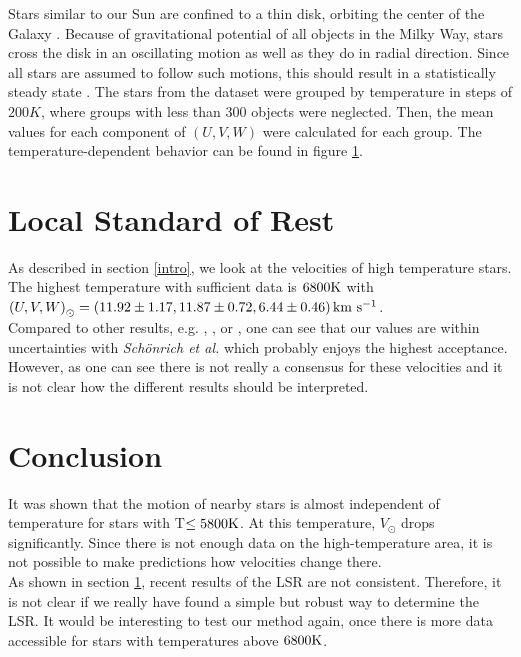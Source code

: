 \documentclass{aastex62}
\begin{document}
	Stars similar to our Sun are confined to a thin disk, orbiting the center of the Galaxy \citep{keel}. Because of gravitational potential of all objects in the Milky Way, stars cross the disk in an oscillating motion as well as they do in radial direction. Since all stars are assumed to follow such motions, this should result in a statistically steady state \citep{tayler}. The stars from the dataset were grouped by temperature in steps of $200K$, where groups with less than $300$ objects were neglected. Then, the mean values for each component of $\left( U, V, W\right)$ were calculated for each group. The temperature-dependent behavior can be found in figure \ref{fig:lsrmean}.

	\begin{figure}[ht!]
	\label{fig:lsrmean}
	\end{figure}

	\section{Local Standard of Rest} \label{lsr}

	As described in section \ref{intro}, we look at the velocities of high temperature stars. The highest temperature with sufficient data is $6800\rm K$ with $\left( U, V, W\right)_\odot=\left( 11.92\pm1.17, 11.87\pm0.72, 6.44\pm0.46 \right)\rm km~s^{-1}$.
	\\
	Compared to other results, e.g. \citep{schoenrich}, \citep{boby}, \citep{francis} or \citep{ding}, one can see that our values are within uncertainties with \textit{Sch\"onrich et al.} which probably enjoys the highest acceptance. However, as one can see there is not really a consensus for these velocities and it is not clear how the different results should be interpreted.

	\section{Conclusion}

	It was shown that the motion of nearby stars is almost independent of temperature for stars with T$\leq 5800\rm K$. At this temperature, $V_\odot$ drops significantly. Since there is not enough data on the high-temperature area, it is not possible to make predictions how velocities change there.
	\\
	As shown in section \ref{lsr}, recent results of the LSR are not consistent. Therefore, it is not clear if we really have found a simple but robust way to determine the LSR. It would be interesting to test our method again, once there is more data accessible for stars with temperatures above $6800\rm K$.
	
\end{document}
